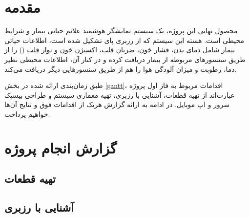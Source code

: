 \documentclass[12pt]{article}
\begin{document}
\newpage
\pagestyle{fancy}
\fancyhf{}
\fancyfoot{}
\cfoot{\thepage}
\chead{}

\newfontfamily{}

\KashidaOff
 \newcommand{\inlineLatin}[1]{
	\small{\lr{{\terminal #1}}}
}


\tableofcontents
\listoffigures

\newpage
\section{مقدمه}


محصول نهایی این پروژه، یک سیستم نمایشگر هوشمند علائم حیاتی بیمار و شرایط محیطی است. هسته این سیستم که از رزبری پای تشکیل شده است، اطلاعات حیاتی بیمار شامل دمای بدن، فشار خون، ضربان قلب، اکسیژن خون و نوار قلب () را از طریق سنسور‌های مربوطه از بیمار دریافت کرده و در کنار آن، اطلاعات محیطی نظیر دما،‌ رطوبت و میزان آلودگی هوا را هم از طریق سنسورهایی دیگر دریافت می‌کند.

طبق زمان‌بندی ارائه شده در بخش \ref{gantt}، اقدامات مربوط به فاز اول پروژه عبارت‌اند از تهیه قطعات، آشنایی با رزبری، تهیه معماری سیستم و طراحی بیسیک سرور و اپ موبایل.
در ادامه به ارائه گزارش هریک از اقدامات فوق و نتایج آن‌ها خواهیم پرداخت.

\section{گزارش انجام پروژه}
\subsection{تهیه قطعات}
\subsection{آشنایی با رزبری}
\end{document}
